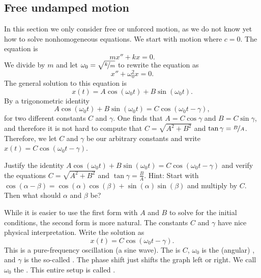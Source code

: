 \subsection{Free undamped motion}

In this section we only consider free or unforced motion,
as we do not know yet how to solve nonhomogeneous equations.
We start with
 motion where $c=0$.  The equation is
\begin{equation*}
mx'' + kx = 0 .
\end{equation*}
We divide by $m$ and let $\omega_0 = \sqrt{\nicefrac{k}{m}}$ to rewrite the equation as
\begin{equation*}
x'' + \omega_0^2 x = 0 .
\end{equation*}
The general solution to this equation is
\begin{equation*}
x(t) = A \cos (\omega_0 t) + B \sin (\omega_0 t) .
\end{equation*}
By a trigonometric identity
\begin{equation*}
A \cos (\omega_0 t) + B \sin (\omega_0 t) =
C \cos ( \omega_0 t - \gamma ) ,
\end{equation*}
for two different constants $C$ and $\gamma$.
One finds that $A = C \cos \gamma$ and $B = C \sin \gamma$,
and therefore
it is not hard to compute that $C= \sqrt{A^2 + B^2}$ and $\tan \gamma =
\nicefrac{B}{A}$.
Therefore, we let
$C$ and $\gamma$ be our arbitrary constants and write
$x(t) = C \cos ( \omega_0 t - \gamma )$.

\begin{exercise}
Justify the identity $A \cos (\omega_0 t) + B \sin (\omega_0 t) =
C \cos ( \omega_0 t - \gamma )$ and verify the equations $C = \sqrt{A^2+B^2}$
and $\tan \gamma = \frac{B}{A}$.  Hint: Start with
$\cos (\alpha-\beta) = \cos (\alpha) \cos
(\beta) + \sin (\alpha)\sin (\beta)$ and multiply by $C$.  Then what should
$\alpha$ and $\beta$ be?
\end{exercise}

While it is easier to use the first form with $A$ and $B$
to solve for the initial conditions, the second form is more natural.
The constants $C$ and $\gamma$ have nice physical interpretation.
Write the solution as
\begin{equation*}
x(t) = C \cos ( \omega_0 t - \gamma ) .
\end{equation*}
This is a pure-frequency oscillation (a sine wave).
The \emph{} is $C$, $\omega_0$ is the (angular)
\emph{},
and $\gamma$ is the so-called \emph{}.
The phase shift just shifts the
graph left or right.
We call $\omega_0$ the \emph{}.
This entire setup is 
called \emph{}.

